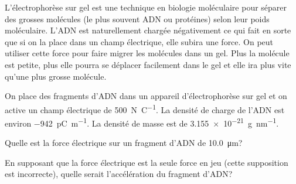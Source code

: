 \begin{diapobox}

  L'électrophorèse sur gel est une technique en biologie moléculaire pour
  séparer des grosses molécules (le plus souvent ADN ou protéines) selon leur
  poids moléculaire. L'ADN est naturellement chargée négativement ce qui fait
  en sorte que si on la place dans un champ électrique, elle subira une force.
  On peut utiliser cette force pour faire migrer les molécules dans un gel.
  Plus la molécule est petite, plus elle pourra se déplacer facilement dans le
  gel et elle ira plus vite qu'une plus grosse molécule.

  On place des fragments d'ADN dans un appareil d'électrophorèse sur gel et on
  active un champ électrique de \SI{500}{\newton\per\coulomb}. La densité de
  charge de l'ADN est environ \SI{-942}{\pico\coulomb\per\meter}. La densité de
  masse est de \SI{3.155e-21}{\gram\per\nano\meter}.

  Quelle est la force électrique sur un fragment d'ADN de
  \SI{10.0}{\micro\meter}?

  En supposant que la force électrique est la seule force en jeu (cette
  supposition est incorrecte), quelle serait l'accélération du fragment d'ADN?

\end{diapobox}


